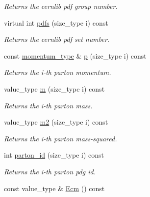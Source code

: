 \begin{DoxyCompactItemize}
\begin{DoxyCompactList}\small\item\em Returns the cernlib pdf group number. \end{DoxyCompactList}\item 
\hypertarget{a00304_a7100bd4284c20cb44edabb76d2650db9}{virtual int \hyperlink{a00304_a7100bd4284c20cb44edabb76d2650db9}{pdfs} (size\-\_\-type i) const }\label{a00304_a7100bd4284c20cb44edabb76d2650db9}

\begin{DoxyCompactList}\small\item\em Returns the cernlib pdf set number. \end{DoxyCompactList}\item 
\hypertarget{a00304_ab75f2fa9fd1e30dbf7771090aba0cde7}{const \hyperlink{a00559}{momentum\-\_\-type} \& \hyperlink{a00304_ab75f2fa9fd1e30dbf7771090aba0cde7}{p} (size\-\_\-type i) const }\label{a00304_ab75f2fa9fd1e30dbf7771090aba0cde7}

\begin{DoxyCompactList}\small\item\em Returns the i-\/th parton momentum. \end{DoxyCompactList}\item 
\hypertarget{a00304_a2a95cea4e7fd1e59bf96fed7225afdf2}{value\-\_\-type \hyperlink{a00304_a2a95cea4e7fd1e59bf96fed7225afdf2}{m} (size\-\_\-type i) const }\label{a00304_a2a95cea4e7fd1e59bf96fed7225afdf2}

\begin{DoxyCompactList}\small\item\em Returns the i-\/th parton mass. \end{DoxyCompactList}\item 
\hypertarget{a00304_a70734e64cb54bccffc222d30d2bf390f}{value\-\_\-type \hyperlink{a00304_a70734e64cb54bccffc222d30d2bf390f}{m2} (size\-\_\-type i) const }\label{a00304_a70734e64cb54bccffc222d30d2bf390f}

\begin{DoxyCompactList}\small\item\em Returns the i-\/th parton mass-\/squared. \end{DoxyCompactList}\item 
\hypertarget{a00304_a12b501200a00862519c4ce1cd28c47e0}{int \hyperlink{a00304_a12b501200a00862519c4ce1cd28c47e0}{parton\-\_\-id} (size\-\_\-type i) const }\label{a00304_a12b501200a00862519c4ce1cd28c47e0}

\begin{DoxyCompactList}\small\item\em Returns the i-\/th parton pdg id. \end{DoxyCompactList}\item 
\hypertarget{a00304_a1c44f2d8ae296992dabfe40a333ffde7}{const value\-\_\-type \& \hyperlink{a00304_a1c44f2d8ae296992dabfe40a333ffde7}{Ecm} () const }\label{a00304_a1c44f2d8ae296992dabfe40a333ffde7}


\end{DoxyCompactItemize}
